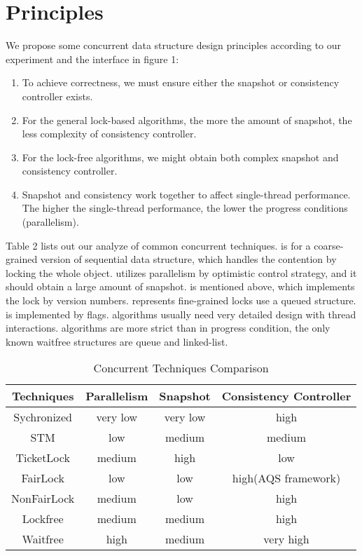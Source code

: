 \documentclass{article}
\begin{document}
\section{Principles}
We propose some concurrent data structure design principles according to our experiment and the interface in figure 1:
    \begin{enumerate}
    \item To achieve correctness, we must ensure either the snapshot or consistency controller exists.
    \item For the general lock-based algorithms, the more the amount of snapshot, the less complexity of consistency controller.
    \item For the lock-free algorithms, we might obtain both complex snapshot and consistency controller.
    \item Snapshot and consistency work together to affect single-thread performance. The higher the single-thread performance, the lower the progress conditions (parallelism).
    \end{enumerate}
Table 2 lists out our analyze of common concurrent techniques.  is for a coarse-grained version of sequential data structure, which handles the contention by locking the whole object.  utilizes parallelism by optimistic control strategy, and it should obtain a large amount of snapshot.  is mentioned above, which implements the lock by version numbers.  represents fine-grained locks use a queued structure.  is implemented by flags.  algorithms usually need very detailed design with thread interactions.  algorithms are more strict than  in progress condition, the only known waitfree structures are queue\cite{kogan2011wait} and linked-list\cite{timnat2012wait}.
        \begin{table}[htbp]
    \centering
    \begin{tabular}{c|c|c|c}
     \hline
     \textbf{Techniques} & \textbf{Parallelism} & \textbf{Snapshot} & \textbf{Consistency Controller}  \\
     \hline
     Sychronized & very low & very low & high \\
     STM & low & medium & medium\\
     TicketLock & medium & high & low\\
     FairLock & low & low & high(AQS framework)\\
     NonFairLock & medium & low & high\\
     Lockfree & medium & medium & high\\
     Waitfree & high & medium & very high\\
     \hline
    \end{tabular}
    \caption{Concurrent Techniques Comparison}
    \label{tab:my_label}
    \end{table}
\end{document}
